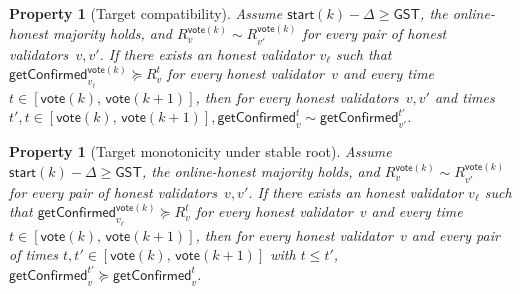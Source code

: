 \ifx\litemode\undefined\documentclass{article}\fi
\newcommand{\start}{\mathsf{start}}
\newcommand{\vote}{\mathsf{vote}}
\newcommand{\getConfirmed}{\textsf{getConfirmed}\xspace}
\theoremstyle{plain}
\newtheorem{property}[theorem]{Property}
\theoremstyle{definition}
\theoremstyle{remark}
\newcommand{\GST}{\ensuremath{\mathsf{GST}}}
\newcommand{\OHM}{online-honest majority\xspace}
\begin{document}
\begin{property}[Target compatibility]\label{rev:prop:getConfirmed-compat}
Assume $\start(k) - \Delta \geq \GST$, the \OHM holds, and $R_v^{\vote(k)} \sim R_{v'}^{\vote(k)}$ for every pair of honest validators~$v, v'$.
If there exists an honest validator $v_\ell$ such that $\getConfirmed_{v_\ell}^{\vote(k)} \succeq R_{v}^t$ for every honest validator~$v$ and every time $t \in [\vote(k),\, \vote(k+1)]$, then for every honest validators~$v,v'$ and times $t',t \in [\vote(k),\, \vote(k+1)], \getConfirmed_v^{t} \sim \getConfirmed_{v'}^{t'}$.
\end{property}

\begin{property}[Target monotonicity under stable root]\label{rev:prop:target-monotonicity}
Assume $\start(k) - \Delta \geq \GST$, the \OHM holds, and $R_v^{\vote(k)} \sim R_{v'}^{\vote(k)}$ for every pair of honest validators~$v, v'$.
If there exists an honest validator $v_\ell$ such that $\getConfirmed_{v_\ell}^{\vote(k)} \succeq R_{v}^t$ for every honest validator~$v$ and every time $t \in [\vote(k),\, \vote(k+1)]$, then for every honest validator~$v$ and every pair of times $t, t' \in [\vote(k),\, \vote(k+1)]$ with $t \leq t'$, $\getConfirmed_v^{t'} \succeq \getConfirmed_v^t$.
\end{property}
\end{document}
